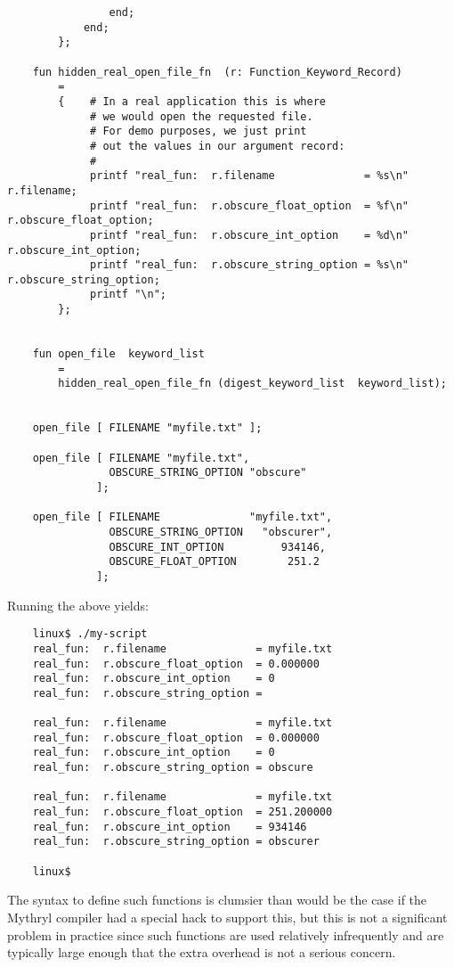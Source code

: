 \begin{verbatim}
                end;
            end;
        };

    fun hidden_real_open_file_fn  (r: Function_Keyword_Record)
        =
        {    # In a real application this is where
             # we would open the requested file.
             # For demo purposes, we just print
             # out the values in our argument record:
             #
             printf "real_fun:  r.filename              = %s\n" r.filename;
             printf "real_fun:  r.obscure_float_option  = %f\n" r.obscure_float_option;
             printf "real_fun:  r.obscure_int_option    = %d\n" r.obscure_int_option;
             printf "real_fun:  r.obscure_string_option = %s\n" r.obscure_string_option;
             printf "\n";
        };


    fun open_file  keyword_list
        =
        hidden_real_open_file_fn (digest_keyword_list  keyword_list);


    open_file [ FILENAME "myfile.txt" ];

    open_file [ FILENAME "myfile.txt",
                OBSCURE_STRING_OPTION "obscure"
              ];

    open_file [ FILENAME              "myfile.txt",
                OBSCURE_STRING_OPTION   "obscurer",
                OBSCURE_INT_OPTION         934146,
                OBSCURE_FLOAT_OPTION        251.2
              ];

\end{verbatim}

Running the above yields:

\begin{verbatim}
    linux$ ./my-script
    real_fun:  r.filename              = myfile.txt
    real_fun:  r.obscure_float_option  = 0.000000
    real_fun:  r.obscure_int_option    = 0
    real_fun:  r.obscure_string_option = 

    real_fun:  r.filename              = myfile.txt
    real_fun:  r.obscure_float_option  = 0.000000
    real_fun:  r.obscure_int_option    = 0
    real_fun:  r.obscure_string_option = obscure

    real_fun:  r.filename              = myfile.txt
    real_fun:  r.obscure_float_option  = 251.200000
    real_fun:  r.obscure_int_option    = 934146
    real_fun:  r.obscure_string_option = obscurer

    linux$
\end{verbatim}

The syntax to define such functions is clumsier than would be the 
case if the Mythryl compiler had a special hack to support this, but 
this is not a significant problem in practice since such functions 
are used relatively infrequently and are typically large enough 
that the extra overhead is not a serious concern.

